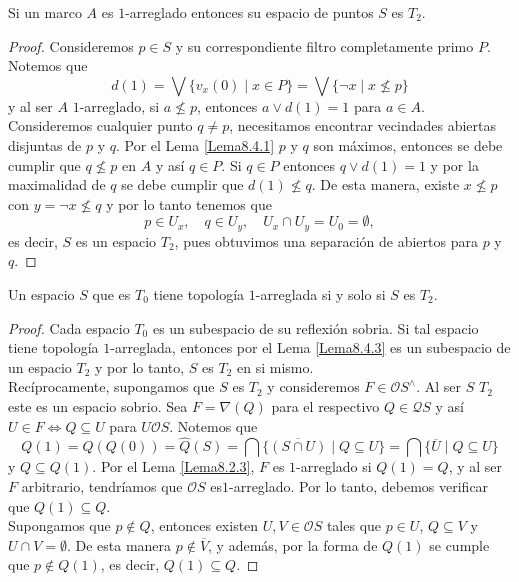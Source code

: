 \begin{lem}\label{Lema8.4.3}
    Si un marco $A$ es $1$-arreglado entonces su espacio de puntos $S$ es $T_2$.
\end{lem}

\begin{proof}
    Consideremos $p\in S$ y su correspondiente filtro completamente primo $P$. Notemos que 
    \[
    d(1)=\bigvee\{v_x(0)\mid x\in P\}=\bigvee\{\neg x\mid x\nleq p\}
    \]
    y al ser $A$ $1$-arreglado, si $a\nleq p$, entonces $a\vee d(1)=1$ para $a\in A$. Consideremos cualquier punto $q\neq p$, necesitamos encontrar vecindades abiertas disjuntas de $p$ y $q$. Por el Lema \ref{Lema8.4.1} $p$ y $q$ son máximos, entonces se debe cumplir que $q\nleq p$ en $A$ y así $q\in P$. Si $q\in P$ entonces $q\vee d(1)=1$ y por la maximalidad de $q$ se debe cumplir que $d(1)\nleq q$. De esta manera, existe $x\nleq p$ con $y=\neg x\nleq q$ y por lo tanto tenemos que 
    \[
    p\in U_x,\quad q\in U_y,\quad U_x\cap U_y=U_0=\emptyset,
    \]
    es decir, $S$ es un espacio $T_2$, pues obtuvimos una separación de abiertos para $p$ y $q$.
\end{proof}

\begin{thm}\label{Teorema8.4.4}
    Un espacio $S$ que es $T_0$ tiene topología $1$-arreglada si y solo si $S$ es $T_2$.
\end{thm}

\begin{proof}
    Cada espacio $T_0$ es un subespacio de su reflexión sobria. Si tal espacio tiene topología $1$-arreglada, entonces por el Lema \ref{Lema8.4.3} es un subespacio de un espacio $T_2$ y por lo tanto, $S$ es $T_2$ en si mismo.\\

    Recíprocamente, supongamos que $S$ es $T_2$ y consideremos $F\in \mathcal{O}S^\wedge$. Al ser $S$ $T_2$ este es un espacio sobrio. Sea $F=\nabla(Q)$ para el respectivo $Q\in \mathcal{Q}S$ y así $U\in F\Leftrightarrow Q\subseteq U$ para $U\mathcal{O}S$. Notemos que 
    \[
    Q(1)=\hat{Q}(Q(0))=\hat{Q}(S)=\bigcap\{\overline{(S\cap U)}\mid Q\subseteq U\}=\bigcap\{\overline{U}\mid Q\subseteq U\}
    \]
    y $Q\subseteq Q(1)$. Por el Lema \ref{Lema8.2.3},  $F$ es $1$-arreglado si $Q(1)=Q$, y al ser $F$ arbitrario, tendríamos que $\mathcal{O}S$ es$1$-arreglado. Por lo tanto, debemos verificar que $Q(1)\subseteq Q$.\\

    Supongamos que $p\notin Q$, entonces existen $U, V\in \mathcal{O}S$ tales que $p\in U$, $Q\subseteq V$ y $U\cap V=\emptyset$. De esta manera $p\notin \overline{V}$, y además, por la forma de $Q(1)$ se cumple que $p\notin Q(1)$, es decir, $Q(1)\subseteq Q$.
\end{proof}

